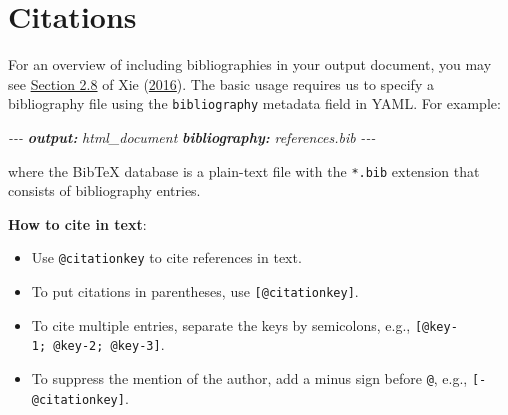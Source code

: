 \documentclass[
  a4paper,
  twoside,
  openright]{book}
\newenvironment{Shaded}{\begin{snugshade}}{\end{snugshade}}
\newcommand{\AnnotationTok}[1]{\textcolor[rgb]{0.56,0.35,0.01}{\textbf{\textit{#1}}}}
\newcommand{\CommentTok}[1]{\textcolor[rgb]{0.56,0.35,0.01}{\textit{#1}}}
\theoremstyle{definition}
\theoremstyle{definition}
\theoremstyle{definition}
\theoremstyle{definition}
\theoremstyle{remark}
\begin{document}
\section{Citations}\label{citations}

For an overview of including bibliographies in your output document, you may see \href{https://bookdown.org/yihui/bookdown/citations.html}{Section 2.8} of Xie (\href{https://bookdown.org/yihui/rmarkdown-cookbook/bibliography.html\#ref-bookdown2016}{2016}). The basic usage requires us to specify a bibliography file using the \texttt{bibliography} metadata field in YAML. For example:

\begin{Shaded}
\begin{Highlighting}[]
\CommentTok{{-}{-}{-}}
\AnnotationTok{output:}\CommentTok{ html\_document}
\AnnotationTok{bibliography:}\CommentTok{ references.bib  }
\CommentTok{{-}{-}{-}}
\end{Highlighting}
\end{Shaded}

where the BibTeX database is a plain-text file with the \texttt{*.bib} extension that consists of bibliography entries.

\textbf{How to cite in text}:

\begin{itemize}
\item
  Use \texttt{@citationkey} to cite references in text.
\item
  To put citations in parentheses, use \texttt{{[}@citationkey{]}}.
\item
  To cite multiple entries, separate the keys by semicolons, e.g., \texttt{{[}@key-1;\ @key-2;\ @key-3{]}}.
\item
  To suppress the mention of the author, add a minus sign before \texttt{@}, e.g., \texttt{{[}-@citationkey{]}}.
\end{itemize}
\end{document}
